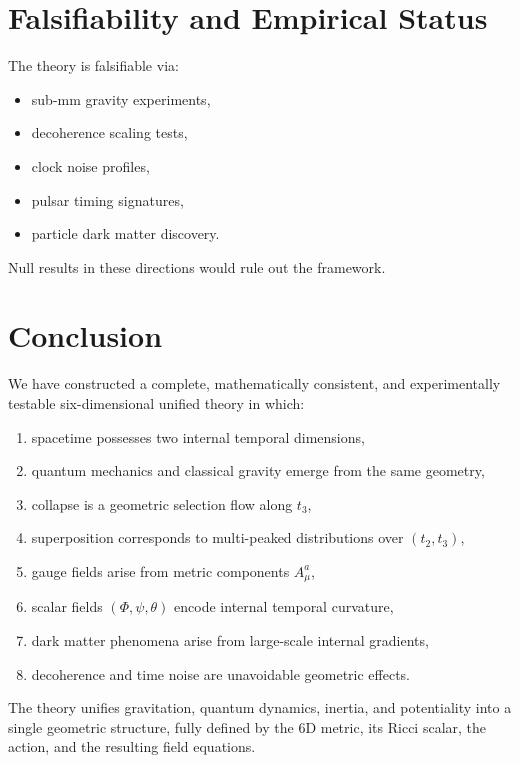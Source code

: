 \documentclass[12pt]{article}
\begin{document}
\newpage
\section{Falsifiability and Empirical Status}

The theory is falsifiable via:
\begin{itemize}
\item sub-mm gravity experiments,
\item decoherence scaling tests,
\item clock noise profiles,
\item pulsar timing signatures,
\item particle dark matter discovery.
\end{itemize}

Null results in these directions would rule out the framework.


\newpage
\section{Conclusion}

We have constructed a complete, mathematically consistent, and experimentally
testable six-dimensional unified theory in which:
\begin{enumerate}
\item spacetime possesses two internal temporal dimensions,
\item quantum mechanics and classical gravity emerge from the same geometry,
\item collapse is a geometric selection flow along \(t_3\),
\item superposition corresponds to multi-peaked distributions over \((t_2,t_3)\),
\item gauge fields arise from metric components \(A_\mu^a\),
\item scalar fields \((\Phi,\psi,\theta)\) encode internal temporal curvature,
\item dark matter phenomena arise from large-scale internal gradients,
\item decoherence and time noise are unavoidable geometric effects.
\end{enumerate}

The theory unifies gravitation, quantum dynamics, inertia, and potentiality
into a single geometric structure, fully defined by the 6D metric, its Ricci
scalar, the action, and the resulting field equations.
\end{document}
